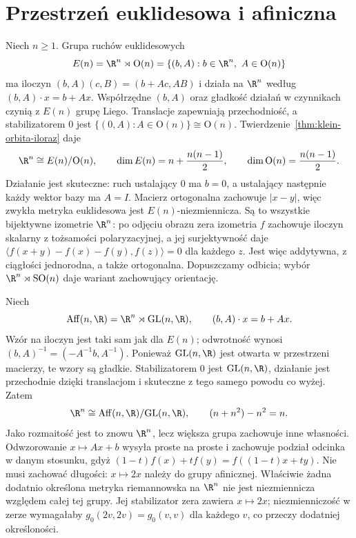 \section{Przestrzeń euklidesowa i afiniczna}
\label{sec:klein-euklidesowa-afiniczna}

\begin{przyklad}
\label{prz:klein-euklidesowa}
Niech $n\geq1$. Grupa ruchów euklidesowych
\[
 E(n)=\R^n\rtimes\mathrm O(n)
 =\{(b,A):b\in\R^n,\ A\in\mathrm O(n)\}
\]
ma iloczyn $(b,A)(c,B)=(b+Ac,AB)$ i działa na $\R^n$
według $(b,A)\cdot x=b+Ax$. Współrzędne $(b,A)$ oraz
gładkość działań w czynnikach czynią z $E(n)$ grupę Liego.
Translacje zapewniają przechodniość, a stabilizatorem $0$
jest $\{(0,A):A\in\mathrm O(n)\}\cong\mathrm O(n)$.
Twierdzenie~\ref{thm:klein-orbita-iloraz} daje
\[
 \R^n\cong E(n)/\mathrm O(n),\qquad
 \dim E(n)=n+\frac{n(n-1)}2,\qquad
 \dim\mathrm O(n)=\frac{n(n-1)}2.
\]
Działanie jest skuteczne: ruch ustalający $0$ ma $b=0$,
a ustalający następnie każdy wektor bazy ma $A=I$.
Macierz ortogonalna zachowuje $|x-y|$, więc zwykła metryka
euklidesowa jest $E(n)$-niezmiennicza. Są to wszystkie bijektywne
izometrie $\R^n$: po odjęciu obrazu zera izometria $f$ zachowuje
iloczyn skalarny z tożsamości polaryzacyjnej, a jej surjektywność
daje $\langle f(x+y)-f(x)-f(y),f(z)\rangle=0$ dla każdego $z$.
Jest więc addytywna, z ciągłości jednorodna, a także ortogonalna.
Dopuszczamy odbicia;
wybór $\R^n\rtimes\mathrm{SO}(n)$ daje wariant zachowujący
orientację.
\end{przyklad}

\begin{przyklad}
\label{prz:klein-afiniczna}
Niech
\[
 \operatorname{Aff}(n,\R)
 =\R^n\rtimes\mathrm{GL}(n,\R),\qquad
 (b,A)\cdot x=b+Ax.
\]
Wzór na iloczyn jest taki sam jak dla $E(n)$; odwrotność
wynosi $(b,A)^{-1}=(-A^{-1}b,A^{-1})$. Ponieważ
$\mathrm{GL}(n,\R)$ jest otwarta w przestrzeni macierzy,
te wzory są gładkie. Stabilizatorem $0$ jest
$\mathrm{GL}(n,\R)$, działanie jest przechodnie dzięki
translacjom i skuteczne z tego samego powodu co wyżej.
Zatem
\[
 \R^n\cong\operatorname{Aff}(n,\R)/\mathrm{GL}(n,\R),
 \qquad (n+n^2)-n^2=n.
\]
Jako rozmaitość jest to znowu $\R^n$, lecz większa grupa
zachowuje inne własności. Odwzorowanie $x\mapsto Ax+b$
wysyła proste na proste i zachowuje podział odcinka w danym
stosunku, gdyż
$(1-t)f(x)+tf(y)=f((1-t)x+ty)$. Nie musi zachować długości:
$x\mapsto2x$ należy do grupy afinicznej.
Właściwie żadna dodatnio określona metryka riemannowska
na $\R^n$ nie jest niezmiennicza względem całej tej grupy.
Jej stabilizator zera zawiera $x\mapsto2x$; niezmienniczość
w zerze wymagałaby $g_0(2v,2v)=g_0(v,v)$ dla każdego $v$,
co przeczy dodatniej określoności.
\end{przyklad}

